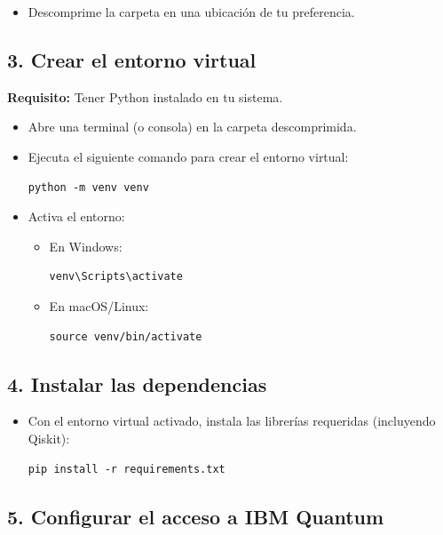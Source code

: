 \documentclass{article}
\begin{document}
\begin{itemize}
    \item Descomprime la carpeta en una ubicación de tu preferencia.
\end{itemize}

\subsection*{3. Crear el entorno virtual}

\textbf{Requisito:} Tener Python instalado en tu sistema.

\begin{itemize}
    \item Abre una terminal (o consola) en la carpeta descomprimida.
    \item Ejecuta el siguiente comando para crear el entorno virtual:

\begin{verbatim}
python -m venv venv
\end{verbatim}

    \item Activa el entorno:
    \begin{itemize}
        \item En Windows:
\begin{verbatim}
venv\Scripts\activate
\end{verbatim}
        \item En macOS/Linux:
\begin{verbatim}
source venv/bin/activate
\end{verbatim}
    \end{itemize}
\end{itemize}

\subsection*{4. Instalar las dependencias}

\begin{itemize}
    \item Con el entorno virtual activado, instala las librerías requeridas (incluyendo Qiskit):

\begin{verbatim}
pip install -r requirements.txt
\end{verbatim}

\end{itemize}

\subsection*{5. Configurar el acceso a IBM Quantum}
\end{document}

